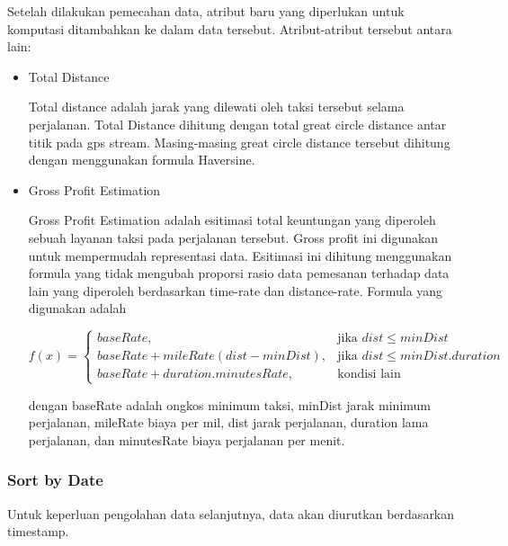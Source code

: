 \documentclass{article}
\begin{document}
\begin{adjustwidth}{4em}{0pt}
	
	\hspace{\parindent}Setelah dilakukan pemecahan data, atribut baru yang diperlukan untuk komputasi ditambahkan ke dalam data tersebut. Atribut-atribut tersebut antara lain:
	
	\begin{itemize}
		\item{Total Distance}
		
		Total distance adalah jarak yang dilewati oleh taksi tersebut selama perjalanan. Total Distance dihitung dengan total  great circle distance antar titik pada gps stream. Masing-masing great circle distance tersebut dihitung dengan menggunakan formula Haversine.
		
		\item{Gross Profit Estimation}
		
		Gross Profit Estimation adalah esitimasi  total keuntungan  yang diperoleh sebuah layanan taksi pada perjalanan tersebut. Gross profit ini digunakan untuk mempermudah representasi data. Esitimasi ini dihitung menggunakan formula yang tidak mengubah proporsi rasio data pemesanan terhadap data lain yang diperoleh berdasarkan time-rate dan distance-rate. Formula yang digunakan adalah
		
		\[
		f(x) = 
		\begin{cases}
		baseRate,& \text{jika } dist \leq minDist \\
		baseRate+mileRate(dist-minDist),& \text{jika } dist \le minDist.duration \\
		baseRate+duration.minutesRate, & \text{kondisi lain}
		\end{cases}
		\]
		
		dengan baseRate adalah ongkos minimum taksi, minDist jarak minimum perjalanan, mileRate biaya per mil, dist jarak perjalanan, duration lama perjalanan, dan minutesRate biaya perjalanan per menit.
		
	\end{itemize}
	
	
\end{adjustwidth}

\subsubsection{Sort by Date}

\begin{adjustwidth}{4em}{0pt}
	
	\hspace{\parindent}Untuk keperluan pengolahan data selanjutnya, data akan diurutkan berdasarkan timestamp.
	
\end{adjustwidth}
\end{document}
